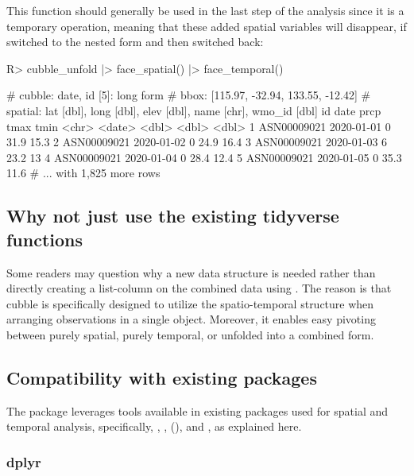 \documentclass[
]{jss}
\begin{document}
This function should generally be used in the last step of the analysis since it is a temporary operation, meaning that these added spatial variables will disappear, if switched to the nested form and then switched back:

\begin{CodeChunk}
\begin{CodeInput}
R> cubble_unfold |> face_spatial() |> face_temporal()
\end{CodeInput}
\begin{CodeOutput}
# cubble:  date, id [5]: long form
# bbox:    [115.97, -32.94, 133.55, -12.42]
# spatial: lat [dbl], long [dbl], elev [dbl], name [chr], wmo_id [dbl]
  id          date        prcp  tmax  tmin
  <chr>       <date>     <dbl> <dbl> <dbl>
1 ASN00009021 2020-01-01     0  31.9  15.3
2 ASN00009021 2020-01-02     0  24.9  16.4
3 ASN00009021 2020-01-03     6  23.2  13  
4 ASN00009021 2020-01-04     0  28.4  12.4
5 ASN00009021 2020-01-05     0  35.3  11.6
# ... with 1,825 more rows
\end{CodeOutput}
\end{CodeChunk}

\hypertarget{tidyverse}{%
\subsection{Why not just use the existing tidyverse functions}\label{tidyverse}}

Some readers may question why a new data structure is needed rather than directly creating a list-column on the combined data using . The reason is that cubble is specifically designed to utilize the spatio-temporal structure when arranging observations in a single object. Moreover, it enables easy pivoting between purely spatial, purely temporal, or unfolded into a combined form.

\hypertarget{compact}{%
\subsection{Compatibility with existing packages}\label{compact}}

The  package leverages tools available in existing packages used for spatial and temporal analysis, specifically, , ,  (), and , as explained here.

\hypertarget{dplyr}{%
\subsubsection{dplyr}\label{dplyr}}
\end{document}

